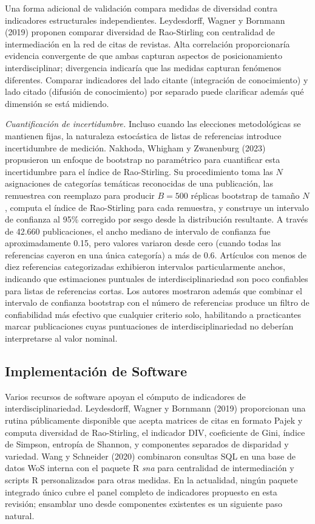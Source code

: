 \documentclass[
]{article}
\begin{document}
Una forma adicional de validación compara medidas de diversidad contra
indicadores estructurales independientes. Leydesdorff, Wagner y Bornmann
(2019) proponen comparar diversidad de Rao-Stirling con centralidad de
intermediación en la red de citas de revistas. Alta correlación
proporcionaría evidencia convergente de que ambas capturan aspectos de
posicionamiento interdisciplinar; divergencia indicaría que las medidas
capturan fenómenos diferentes. Comparar indicadores del lado citante
(integración de conocimiento) y lado citado (difusión de conocimiento)
por separado puede clarificar además qué dimensión se está midiendo.

\emph{Cuantificación de incertidumbre.} Incluso cuando las elecciones
metodológicas se mantienen fijas, la naturaleza estocástica de listas de
referencias introduce incertidumbre de medición. Nakhoda, Whigham y
Zwanenburg (2023) propusieron un enfoque de bootstrap no paramétrico
para cuantificar esta incertidumbre para el índice de Rao-Stirling. Su
procedimiento toma las \(N\) asignaciones de categorías temáticas
reconocidas de una publicación, las remuestrea con reemplazo para
producir \(B = 500\) réplicas bootstrap de tamaño \(N\), computa el
índice de Rao-Stirling para cada remuestra, y construye un intervalo de
confianza al 95\% corregido por sesgo desde la distribución resultante.
A través de 42.660 publicaciones, el ancho mediano de intervalo de
confianza fue aproximadamente 0.15, pero valores variaron desde cero
(cuando todas las referencias cayeron en una única categoría) a más de
0.6. Artículos con menos de diez referencias categorizadas exhibieron
intervalos particularmente anchos, indicando que estimaciones puntuales
de interdisciplinariedad son poco confiables para listas de referencias
cortas. Los autores mostraron además que combinar el intervalo de
confianza bootstrap con el número de referencias produce un filtro de
confiabilidad más efectivo que cualquier criterio solo, habilitando a
practicantes marcar publicaciones cuyas puntuaciones de
interdisciplinariedad no deberían interpretarse al valor nominal.

\hypertarget{implementaciuxf3n-de-software}{%
\subsection{Implementación de
Software}\label{implementaciuxf3n-de-software}}

Varios recursos de software apoyan el cómputo de indicadores de
interdisciplinariedad. Leydesdorff, Wagner y Bornmann (2019)
proporcionan una rutina públicamente disponible que acepta matrices de
citas en formato Pajek y computa diversidad de Rao-Stirling, el
indicador DIV, coeficiente de Gini, índice de Simpson, entropía de
Shannon, y componentes separados de disparidad y variedad. Wang y
Schneider (2020) combinaron consultas SQL en una base de datos WoS
interna con el paquete R \emph{sna} para centralidad de intermediación y
scripts R personalizados para otras medidas. En la actualidad, ningún
paquete integrado único cubre el panel completo de indicadores propuesto
en esta revisión; ensamblar uno desde componentes existentes es un
siguiente paso natural.
\end{document}
